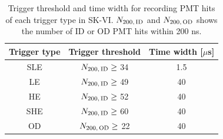 \begin{table}[h]
	\caption[Trigger threshold and time width for recording PMT hits of each trigger type in SK-VI]{\label{SK_Tab:Tri} Trigger threshold and time width for recording PMT hits of each trigger type in SK-VI. $N_{200,\,{\rm ID}}$ and $N_{200,\,{\rm OD}}$ shows the number of ID or OD PMT hits within 200 ns.}
	\centering
	\vs
	\begin{tabular}{ccc}
		\hline\hline
		Trigger type&Trigger threshold&Time width [$\mu$s]\\
		\hline
		SLE&$N_{200,\,{\rm ID}}\ge$ 34&1.5\\
		LE&$N_{200,\,{\rm ID}}\ge$ 49&40\\
		HE&$N_{200,\,{\rm ID}}\ge$ 52&40\\
		SHE&$N_{200,\,{\rm ID}}\ge$ 60&40\\
		OD&$N_{200,\,{\rm OD}}\ge$ 22&40\\
		\hline\hline
	\end{tabular}
\end{table}


\newpage
